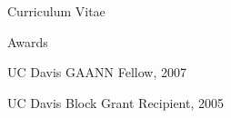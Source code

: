 \documentclass[12pt]{amsart}
\begin{document}
\begin{cv}{Curriculum Vitae}
\begin{cvlist}{Awards}
\item UC Davis GAANN Fellow, 2007 
\item UC Davis Block Grant Recipient, 2005
\end{cvlist}

\end{cv}
\end{document}
